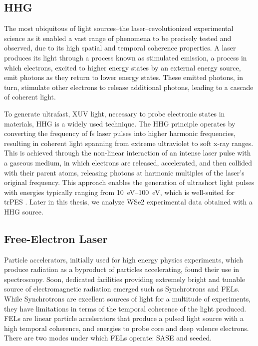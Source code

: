 \subsection*{HHG}
The most ubiquitous of light sources--the laser--revolutionized experimental science as it enabled a vast range of phenomena to be precisely tested and observed, due to its high spatial and temporal coherence properties. A laser produces its light through a process known as stimulated emission, a process in which electrons, excited to higher energy states by an external energy source, emit photons as they return to lower energy states. These emitted photons, in turn, stimulate other electrons to release additional photons, leading to a cascade of coherent light.

To generate ultrafast, \gls{XUV} light, necessary to probe electronic states in materials, \gls{HHG} is a widely used technique. The \Gls{HHG} principle operates by converting the frequency of \unit{fs} laser pulses into higher harmonic frequencies, resulting in coherent light spanning from extreme ultraviolet to soft x-ray ranges. This is achieved through the non-linear interaction of an intense laser pulse with a gaseous medium, in which electrons are released, accelerated, and then collided with their parent atoms, releasing photons at harmonic multiples of the laser’s original frequency. This approach enables the generation of ultrashort light pulses with energies typically ranging from \qtyrange{10}{100}{eV}, which is well-suited for \gls{trPES} \cite{macklinHighorderHarmonicGeneration1993}. Later in this thesis, we analyze \gls{WSe2} experimental data obtained with a \gls{HHG} source.

\subsection*{Free-Electron Laser}
Particle accelerators, initially used for high energy physics experiments, which produce radiation as a byproduct of particles accelerating, found their use in spectroscopy. Soon, dedicated facilities providing extremely bright and tunable source of electromagnetic radiation emerged such as Synchrotrons and \glspl{FEL}.
While Synchrotrons are excellent sources of light for a multitude of experiments, they have limitations in terms of the temporal coherence of the light produced. \Glspl{FEL} are linear particle accelerators that produce a pulsed light source with a high temporal coherence, and energies to probe core and deep valence electrons. There are two modes under which \glspl{FEL} operate: \gls{SASE} and seeded.

